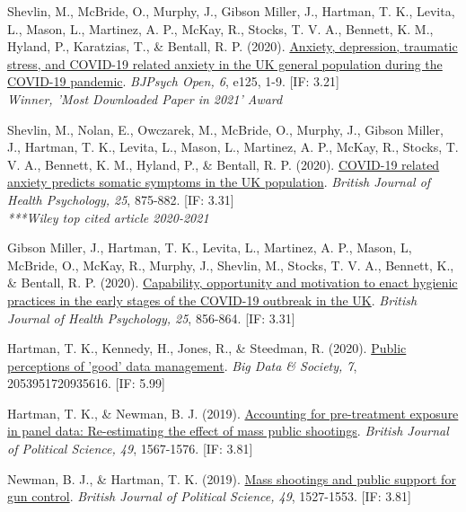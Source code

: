 \documentclass[12pt]{article}
\begin{document}
\begin{bibenum}
\item Shevlin, M.,  McBride, O., Murphy, J., 
	Gibson Miller, J., Hartman, T. K., Levita, L., 
	Mason, L., Martinez, A. P., McKay, R., 
	Stocks, T. V. A., Bennett, K. M., Hyland, P., 
	Karatzias, T., \& Bentall, R. P. (2020). 
	\href{https://doi.org/10.1192/bjo.2020.109}
	{Anxiety, depression, traumatic stress, and COVID-19 
	related anxiety in the UK general population 
	during the COVID-19 pandemic}.
	\emph{BJPsych Open, 6}, e125, 1-9. [IF: 3.21]\\
	\textit{Winner, 'Most Downloaded Paper in 2021' Award}

\item Shevlin, M., Nolan, E., Owczarek, M., 
	McBride, O., Murphy, J., Gibson Miller, J., 
	Hartman, T. K., Levita, L., Mason, L., 
	Martinez, A. P., McKay, R., Stocks, T. V. A., 
	Bennett, K. M., Hyland, P., \& Bentall, R. P. (2020).
	\href{https://doi.org/10.1111/bjhp.12430}
	{COVID-19 related anxiety predicts somatic 
	symptoms in the UK population}.
	\emph{British Journal of Health Psychology, 25}, 
	875-882. [IF: 3.31]\\
	\textit{***Wiley top cited article 2020-2021}

\item Gibson Miller, J., Hartman, T. K., Levita, L., 
	Martinez, A. P., Mason, L, McBride, O., 
	McKay, R., Murphy, J., Shevlin, M., 
	Stocks, T. V. A., Bennett, K., \& Bentall, 
	R. P. (2020).  
	\href{https://doi.org/10.1111/bjhp.12426}{Capability, 
	opportunity and motivation to enact hygienic 
	practices in the early stages of the COVID-19 
	outbreak in the UK}. 
	\emph{British Journal of Health Psychology, 25}, 
	856-864. [IF: 3.31]
	
\item Hartman, T. K., Kennedy, H., 
		Jones, R., \& Steedman, R. (2020). 
		\href{https://doi.org/10.1177/2053951720935616}	
		{Public perceptions of 'good' data management}.
	 	\emph{Big Data \& Society, 7}, 
	 	2053951720935616. [IF: 5.99]
		
\item Hartman, T. K., \& Newman, B. J. (2019). 
	\href{https://doi.org/10.1017/S0007123418000467}
	{Accounting for pre-treatment exposure in panel 
	data: Re-estimating the effect of mass 
	public shootings}. 
	\emph{British Journal of Political Science, 49}, 
	1567-1576. [IF: 3.81]

    \item *Newman, B. J., \& {Hartman, T. K.} (2019).
          \href{https://10.1017/S0007123417000333}
          {Mass shootings and public support for gun control}.
          \emph{British Journal of Political Science, 49}, 1527-1553. [IF: 3.81]
      

\end{bibenum}
\end{document}
